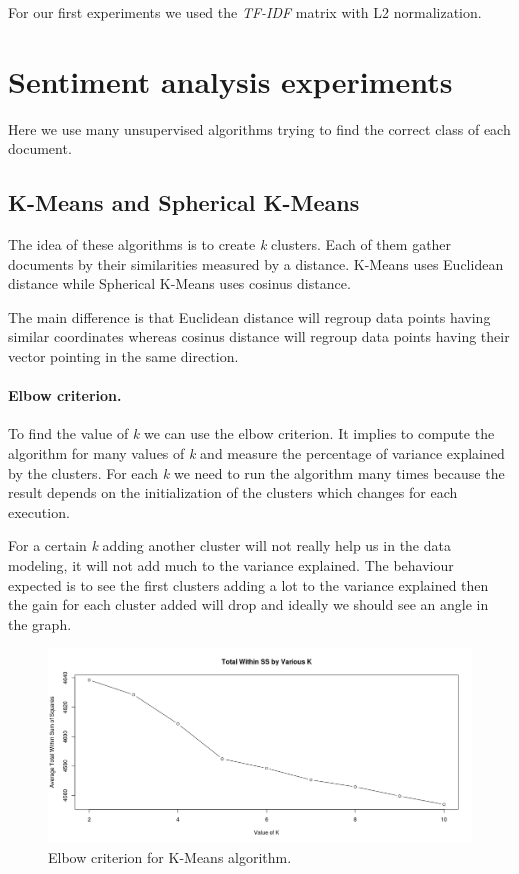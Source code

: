 \documentclass{article}
\begin{document}
For our first experiments we used the \textit{TF-IDF} matrix with L2 normalization.



\section{Sentiment analysis experiments}

Here we use many unsupervised algorithms trying to find the correct class of each document.



\subsection{K-Means and Spherical K-Means}

The idea of these algorithms is to create \textit{k} clusters. Each of them gather documents by their similarities measured by a distance. K-Means uses Euclidean distance while Spherical K-Means uses cosinus distance.

The main difference is that Euclidean distance will regroup data points having similar coordinates whereas cosinus distance will regroup data points having their vector pointing in the same direction.

\paragraph{Elbow criterion.}
To find the value of \textit{k} we can use the elbow criterion. It implies to compute the algorithm for many values of \textit{k} and measure the percentage of variance explained by the clusters. For each \textit{k} we need to run the algorithm many times because the result depends on the initialization of the clusters which changes for each execution.

For a certain \textit{k} adding another cluster will not really help us in the data modeling, it will not add much to the variance explained. The behaviour expected is to see the first clusters adding a lot to the variance explained then the gain for each cluster added will drop and ideally we should see an angle in the graph.

\begin{figure}[H] 
\centering
\includegraphics[width=\textwidth]{Kmeans_tf-idf-l2_elbow_criterion.png}
\caption{Elbow criterion for K-Means algorithm.}
\label{fig:elbow}
\end{figure}
\end{document}
